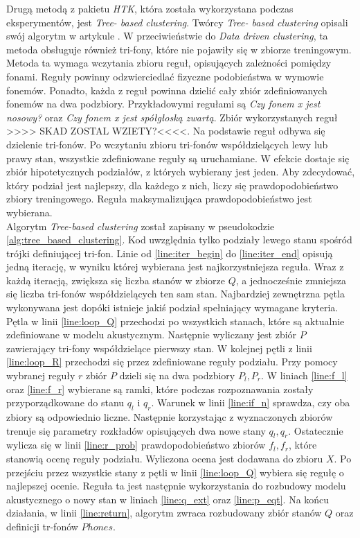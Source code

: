 \documentclass[11pt]{article}
\begin{document}
	Drugą metodą z pakietu \textit{HTK}, która została wykorzystana podczas eksperymentów, jest \textit{Tree- based clustering}. Twórcy \textit{Tree- based clustering} opisali swój algorytm w artykule \cite{tree_based_clustring}. W przeciwieństwie do \textit{Data driven clustering}, ta metoda obsługuje również tri-fony, które nie pojawiły się w zbiorze treningowym. Metoda ta wymaga wczytania zbioru reguł, opisujących zależności pomiędzy fonami. Reguły powinny odzwierciedlać fizyczne podobieństwa w wymowie fonemów. Ponadto, każda z reguł powinna dzielić cały zbiór zdefiniowanych fonemów na dwa podzbiory. Przykładowymi regułami są \textit{Czy fonem x jest nosowy?} oraz \textit{Czy fonem x jest spółgłoską zwartą}. Zbiór wykorzystanych reguł >>>> SKAD ZOSTAL WZIETY?<<<<.  Na podstawie reguł odbywa się dzielenie tri-fonów. Po wczytaniu zbioru tri-fonów współdzielących lewy lub prawy stan, wszystkie zdefiniowane reguły są uruchamiane. W efekcie dostaje się zbiór hipotetycznych podziałów, z których wybierany jest jeden. Aby zdecydować, który podział jest najlepszy, dla każdego z nich, liczy się prawdopodobieństwo zbiory treningowego. Reguła maksymalizująca prawdopodobieństwo jest wybierana. \\
	Algorytm \textit{Tree-based clustering} został zapisany w pseudokodzie \ref{alg:tree_based_clustering}. Kod uwzględnia tylko podziały lewego stanu spośród trójki definiującej tri-fon. Linie od \ref{line:iter_begin} do \ref{line:iter_end} opisują jedną iterację, w wyniku której wybierana jest najkorzystniejsza reguła. Wraz z każdą iteracją, zwiększa się liczba stanów w zbiorze $Q$, a jednocześnie zmniejsza się liczba tri-fonów współdzielących ten sam stan. Najbardziej zewnętrzna pętla wykonywana jest dopóki istnieje jakiś  podział spełniający wymagane kryteria. Pętla w linii \ref{line:loop_Q} przechodzi po wszystkich stanach, które są aktualnie zdefiniowane w modelu akustycznym. Następnie wyliczany jest zbiór $P$ zawierający tri-fony współdzielące pierwszy stan. W kolejnej pętli z linii \ref{line:loop_R} przechodzi się przez zdefiniowane reguły podziału. Przy pomocy wybranej reguły $r$ zbiór $P$ dzieli się na dwa podzbiory $P_l, P_r$. W liniach \ref{line:f_l} oraz \ref{line:f_r} wybierane są ramki, które podczas rozpoznawania zostały przyporządkowane do stanu $q_l$ i $q_r$. Warunek w linii \ref{line:if_n} sprawdza, czy oba zbiory są odpowiednio liczne. Następnie korzystając z wyznaczonych zbiorów trenuje się parametry rozkładów opisujących dwa nowe stany $q_l, q_r$. Ostatecznie wylicza się w linii \ref{line:r_prob} prawdopodobieństwo zbiorów $f_l, f_r$, które stanowią ocenę reguły podziału. Wyliczona ocena jest dodawana do zbioru $X$. Po przejściu przez wszystkie stany z pętli w linii \ref{line:loop_Q} wybiera się regułę o najlepszej ocenie. Reguła ta jest następnie wykorzystania do rozbudowy modelu akustycznego o nowy stan w liniach \ref{line:q_ext} oraz \ref{line:p_eqt}. Na końcu działania, w linii \ref{line:return}, algorytm zwraca rozbudowany zbiór stanów $Q$ oraz definicji tr-fonów $Phones$.\\
\end{document}

